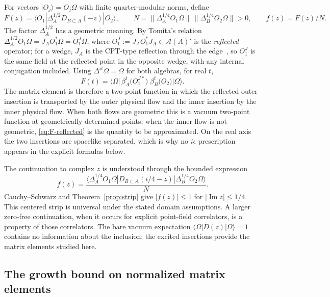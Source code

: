 \documentclass[a4paper,11pt]{article}
\theoremstyle{definition}
\begin{document}
For vectors $|O_j\rangle=O_j\Omega$ with finite quarter-modular norms, define
\begin{equation}
 F(z)=\langle O_1|\Delta_A^{1/2}D_{B\subset A}(-z)|O_2\rangle,
 \qquad
 N=\|\Delta_A^{1/4}O_1\Omega\|\,\|\Delta_B^{1/4}O_2\Omega\|>0,
 \qquad
 f(z)=F(z)/N.
 \label{eq:F-def}
\end{equation}
 The factor $\Delta_A^{1/2}$ has a geometric meaning. By Tomita's relation $\Delta_A^{1/2}O_1\Omega=J_AO_1^*\Omega=O_1^J\Omega$, where $O_1^J:=J_AO_1^*J_A\in\mathcal A(A)'$ is the \emph{reflected} operator; for a wedge, $J_A$ is the CPT-type reflection through the edge~\cite{BisognanoWichmann1975}, so $O_1^J$ is the same field at the reflected point in the opposite wedge, with any internal conjugation included. Using $\Delta^{it}\Omega=\Omega$ for both algebras, for real $t$,
\begin{equation}
 F(t)=\big\langle\Omega\big|\,\beta_A^t\!\bigl(O_1^{J*}\bigr)\;\beta_B^t\!\bigl(O_2\bigr)\big|\Omega\big\rangle .
 \label{eq:F-reflected}
\end{equation}
The matrix element is therefore a two-point function in which the reflected outer insertion is transported by the outer physical flow and the inner insertion by the inner physical flow. When both flows are geometric this is a vacuum two-point function at geometrically determined points; when the inner flow is not geometric, \eqref{eq:F-reflected} is the quantity to be approximated. On the real axis the two insertions are spacelike separated, which is why no $i\epsilon$ prescription appears in the explicit formulas below.

The continuation to complex $z$ is understood through the bounded expression
\begin{equation}
 f(z)=\frac{\langle\Delta_A^{1/4}O_1\Omega|D_{B\subset A}(i/4-z)|\Delta_B^{1/4}O_2\Omega\rangle}{N}.
 \label{eq:f-continuation}
\end{equation}
Cauchy--Schwarz and Theorem~\ref{prop:strip} give $|f(z)|\le1$ for $|\operatorname{Im}z|\le1/4$. This centered strip is universal under the stated domain assumptions. A larger zero-free continuation, when it occurs for explicit point-field correlators, is a property of those correlators. The bare vacuum expectation $\langle\Omega|D(z)|\Omega\rangle=1$ contains no information about the inclusion; the excited insertions provide the matrix elements studied here.

\subsection{The growth bound on normalized matrix elements}\label{subsec:modular-chaos-bound}
\end{document}
